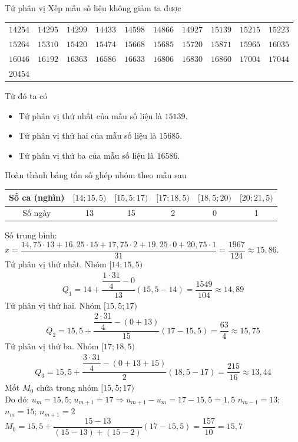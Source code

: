 \begin{ex}
{\begin{listEX}
			Tứ phân  vị
			 Xếp mẫu số liệu không giảm ta được
			\begin{center}
				\begin{tabular}{llllllllll}
					$14254$ &  $14295$ & $14299$ & $14433$ & $14598$ & $14866$ & $14927$ & $15139$ & $15215$ & $15223$ \\
					$15264$ & $15310$ & $15420$ & $15474$ & $15668$ & $15685$ & $15720$  & $15871$ & $15965$ & $16035$ \\
					$16046$ & $16192$ & $16363$ & $16586$ & $16633$ & $16806$ & $16830$ & $16860$ & $17004$ & $17044$ \\ 
					$20454$ & & & & &  & & & &
				\end{tabular}
			\end{center}
			Từ  đó ta có
			\begin{itemize}
				\item Tứ phân vị thứ nhất của mẫu số liệu là $15139$. 
				\item  Tứ phân vị thứ hai của mẫu số liệu là $15685$.
				\item Tứ phân vị thứ ba của mẫu số liệu  là $16586$.
			\end{itemize}
			\item Hoàn thành bảng tần số ghép nhóm  theo mẫu sau
			\begin{center}
				\begin{tabular}{|c|c|c|c|c|c|}
					\hline  Số ca (nghìn) & $[14;15{,}5)$ & $[15{,}5;17)$ & $[17;18{,}5)$ & $[18{,}5;20)$ & $[20;21{,}5)$ \\
					\hline Số ngày &  13 & 15 & 2 & 0 & 1 \\
					 \hline
				\end{tabular}
			\end{center}
			 \item
			Số trung bình: $\overline{x}=\dfrac{14{,}75\cdot 13+16{,}25\cdot 15+17{,}75\cdot 2+19{,}25\cdot 0+20{,}75\cdot 1}{31}=\dfrac{1967}{124} \approx 15{,}86$.\\ 
			Tứ  phân vị thứ nhất. Nhóm $[14;15{,}5)$
			\begin{eqnarray*}
				Q_{1}=14+\dfrac{\dfrac{1\cdot  31}{4}-0}{13}(15{,}5-14)=\dfrac{1549}{104} \approx 14{,}89
			\end{eqnarray*}
			Tứ phân vị thứ hai.  Nhóm $[15{,}5;17)$
			\begin{eqnarray*}
				Q_{2}=15{,}5+\dfrac{\dfrac{2\cdot 31}{4}-(0+13)}{15}(17-15{,}5)=\dfrac{63}{4} \approx  15{,}75
			\end{eqnarray*}
			Tứ  phân vị thứ ba. Nhóm $[17;18{,}5)$
			\begin{eqnarray*}
				Q_{3}=15{,}5+\dfrac{\dfrac{3\cdot  31}{4}-(0+13+15)}{2}(18{,}5-17)=\dfrac{215}{16} \approx 13{,}44
			\end{eqnarray*}
			 Mốt $M_{0}$ chứa trong nhóm $[15{,}5;17)$\\
			Do đó: $u_{m}=15{,}5$;  $u_{m+1}=17 \Rightarrow u_{m+1}-u_{m}=17-15{,}5=1{,}5$
			 $n_{m-1}=13$; $n_{m}=15$; $n_{m+1}=2$
			$M_{0}=15{,}5+\dfrac{15-13}{(15-13)+(15-2)}(17-15{,}5)=\dfrac{157}{10}=15{,}7$ 
		\end{listEX}
	} 
\end{ex}

